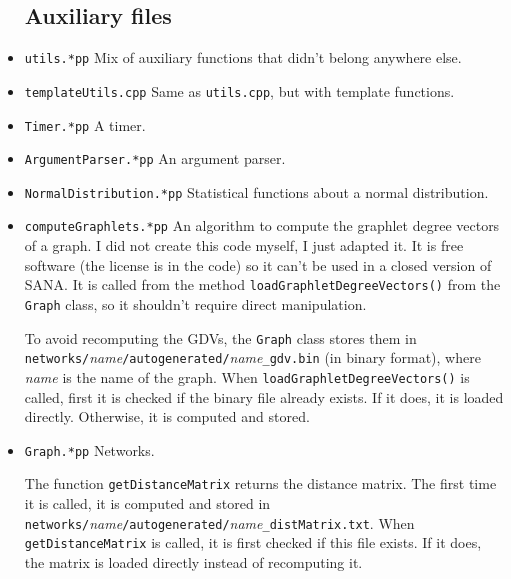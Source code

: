 \documentclass[]{article}
\begin{document}
\begin{itemize}

\subsection{Auxiliary files}


\item \texttt{utils.*pp} Mix of auxiliary functions that didn't belong anywhere else.

\item \texttt{templateUtils.cpp} Same as \texttt{utils.cpp}, but with template functions.

\item \texttt{Timer.*pp} A timer.

\item \texttt{ArgumentParser.*pp} An argument parser.

\item \texttt{NormalDistribution.*pp} Statistical functions about a normal distribution.

\item \texttt{computeGraphlets.*pp} An algorithm to compute the graphlet degree vectors of a graph. I did not create this code myself, I just adapted it. It is free software (the license is in the code) so it can't be used in a closed version of SANA. It is called from the method \texttt{loadGraphletDegreeVectors()} from the \texttt{Graph} class, so it shouldn't require direct manipulation.

To avoid recomputing the GDVs, the \texttt{Graph} class stores them in \\ \texttt{networks/}\textit{name}\texttt{/autogenerated/}\textit{name}\texttt{\_gdv.bin} (in binary format), where \textit{name} is the name of the graph. When \texttt{loadGraphletDegreeVectors()} is called, first it is checked if the binary file already exists. If it does, it is loaded directly. Otherwise, it is computed and stored.

\item \texttt{Graph.*pp} Networks.

The function \texttt{getDistanceMatrix} returns the distance matrix. The first time it is called, it is computed and stored in\\ \texttt{networks/}\textit{name}\texttt{/autogenerated/}\textit{name}\texttt{\_distMatrix.txt}. When \texttt{getDistanceMatrix} is called, it is first checked if this file exists. If it does, the matrix is loaded directly instead of recomputing it.


\end{itemize}
\end{document}
